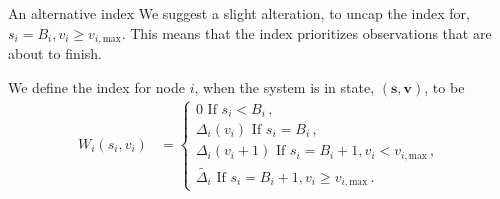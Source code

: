 \documentclass[10pt]{beamer}
\begin{document}
\begin{frame}{An alternative index}
We suggest a slight alteration, to uncap the index for, $s_{i}=B_{i}, v_{i} \geq v_{i,\text{max}}$. This means that the index prioritizes observations that are about to finish.
\begin{definition}
We define the index for node $i$, when the system is in state, $(\bm{s},\bm{v})$, to be
\begin{align*}
W_{i}(s_{i},v_{i})&=\begin{cases}
0 \text{ If } s_{i}<B_{i} \, , \\
\Delta_{i}(v_{i}) \text{ If } s_{i}=B_{i} \, , \\
\Delta_{i}(v_{i}+1) \text{ If } s_{i}=B_{i}+1, v_{i} < v_{i,\text{max}} \, , \\
\widetilde{\Delta_{i}} \text{ If } s_{i}=B_{i}+1, v_{i} \geq v_{i,\text{max}} \, .
\end{cases}
\end{align*}
\end{definition}
\end{frame}
\end{document}
